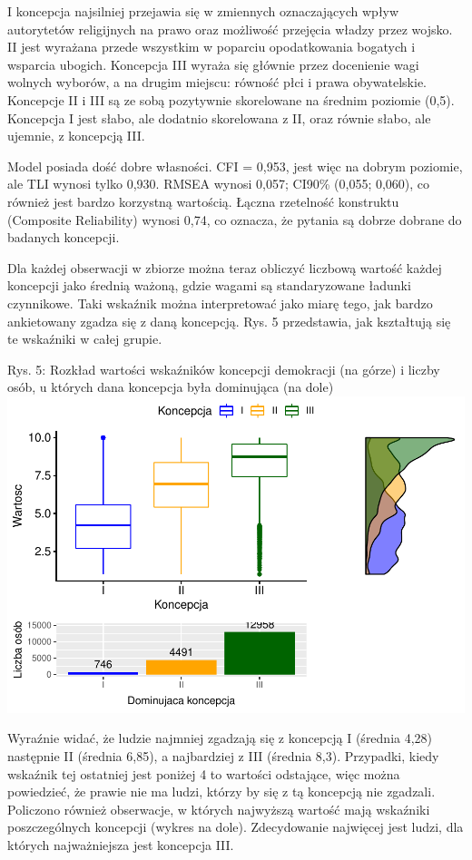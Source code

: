 \documentclass[12pt]{article}
\begin{document}
I koncepcja najsilniej przejawia się w zmiennych oznaczających wpływ autorytetów religijnych na prawo oraz możliwość przejęcia władzy przez wojsko. II jest wyrażana przede wszystkim w poparciu opodatkowania bogatych i wsparcia ubogich. Koncepcja III wyraża się głównie przez docenienie wagi wolnych wyborów, a na drugim miejscu: równość płci i prawa obywatelskie. Koncepcje II i III są ze sobą pozytywnie skorelowane na średnim poziomie (0,5). Koncepcja I jest słabo, ale dodatnio skorelowana z II, oraz równie słabo, ale ujemnie, z koncepcją III.

Model posiada dość dobre własności. CFI = 0,953, jest więc na dobrym poziomie, ale TLI wynosi tylko 0,930. RMSEA wynosi 0,057; CI90\% (0,055; 0,060), co również jest bardzo korzystną wartością. Łączna rzetelność konstruktu (Composite Reliability) wynosi 0,74, co oznacza, że pytania są dobrze dobrane do badanych koncepcji.

Dla każdej obserwacji w zbiorze można teraz obliczyć liczbową wartość każdej koncepcji jako średnią ważoną, gdzie wagami są standaryzowane ładunki czynnikowe. Taki wskaźnik można interpretować jako miarę tego, jak bardzo ankietowany zgadza się z daną koncepcją. Rys. 5 przedstawia, jak kształtują się te wskaźniki w całej grupie.

Rys. 5: Rozkład wartości wskaźników koncepcji demokracji (na górze) i liczby osób, u których dana koncepcja była dominująca (na dole)
\includegraphics{text_ASA_files/figure-latex/stats-all-1.pdf}

Wyraźnie widać, że ludzie najmniej zgadzają się z koncepcją I (średnia 4,28) następnie II (średnia 6,85), a najbardziej z III (średnia 8,3). Przypadki, kiedy wskaźnik tej ostatniej jest poniżej 4 to wartości odstające, więc można powiedzieć, że prawie nie ma ludzi, którzy by się z tą koncepcją nie zgadzali. Policzono również obserwacje, w których najwyższą wartość mają wskaźniki poszczególnych koncepcji (wykres na dole). Zdecydowanie najwięcej jest ludzi, dla których najważniejsza jest koncepcja III.
\end{document}
